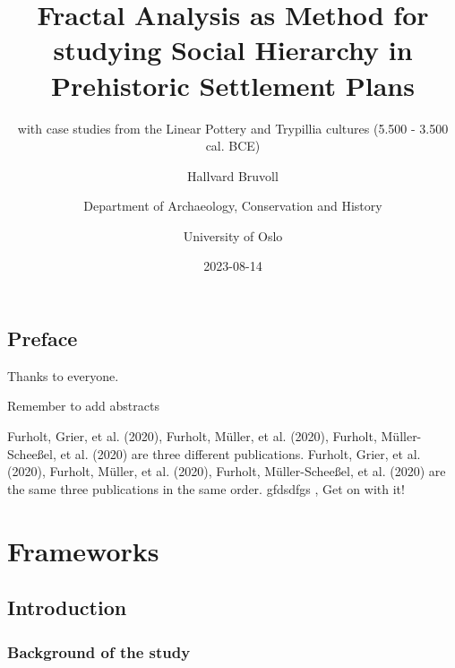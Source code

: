 \documentclass[
  12pt,
]{book}
\title{Fractal Analysis as Method for studying Social Hierarchy in Prehistoric Settlement Plans}
\subtitle{with case studies from the Linear Pottery and Trypillia cultures (5.500 - 3.500 cal. BCE)}
\author{Hallvard Bruvoll \and Department of Archaeology, Conservation and History \and University of Oslo}
\date{2023-08-14}
\begin{document}
\maketitle

{
\setcounter{tocdepth}{2}
\tableofcontents
}
\hypertarget{preface}{%
\chapter*{Preface}\label{preface}}

Thanks to everyone.

Remember to add abstracts

Furholt, Grier, et al. (2020), Furholt, Müller, et al. (2020), Furholt, Müller-Scheeßel, et al. (2020) are three different publications. Furholt, Grier, et al. (2020), Furholt, Müller, et al. (2020), Furholt, Müller-Scheeßel, et al. (2020) are the same three publications in the same order. gfdsdfgs , Get on with it!

\hypertarget{part-frameworks}{%
\part{Frameworks}\label{part-frameworks}}

\hypertarget{intro}{%
\chapter{Introduction}\label{intro}}

\hypertarget{background-of-the-study}{%
\section{Background of the study}\label{background-of-the-study}}
\end{document}
